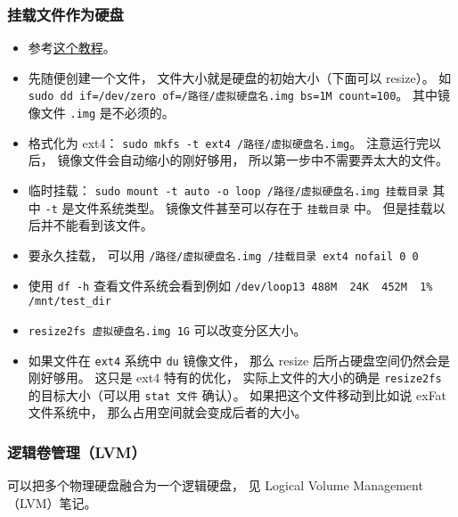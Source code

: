 \subsubsection{挂载文件作为硬盘}
\begin{itemize}
\item 参考\href{https://www.tecmint.com/create-virtual-harddisk-volume-in-linux/}{这个教程}。
\item 先随便创建一个文件， 文件大小就是硬盘的初始大小（下面可以 resize）。 如 \verb|sudo dd if=/dev/zero of=/路径/虚拟硬盘名.img bs=1M count=100|。 其中镜像文件 \verb|.img| 是不必须的。
\item 格式化为 ext4： \verb|sudo mkfs -t ext4 /路径/虚拟硬盘名.img|。 注意运行完以后， 镜像文件会自动缩小的刚好够用， 所以第一步中不需要弄太大的文件。
\item 临时挂载： \verb|sudo mount -t auto -o loop /路径/虚拟硬盘名.img 挂载目录| 其中 \verb|-t| 是文件系统类型。 镜像文件甚至可以存在于 \verb|挂载目录| 中。 但是挂载以后并不能看到该文件。
\item 要永久挂载， 可以用 \verb|/路径/虚拟硬盘名.img /挂载目录 ext4 nofail 0 0|
\item 使用 \verb|df -h| 查看文件系统会看到例如 \verb|/dev/loop13 488M  24K  452M  1% /mnt/test_dir|
\item \verb|resize2fs 虚拟硬盘名.img 1G| 可以改变分区大小。
\item 如果文件在 \verb|ext4| 系统中 \verb|du| 镜像文件， 那么 resize 后所占硬盘空间仍然会是刚好够用。 这只是 ext4 特有的优化， 实际上文件的大小的确是 \verb|resize2fs| 的目标大小（可以用 \verb|stat 文件| 确认）。 如果把这个文件移动到比如说 exFat 文件系统中， 那么占用空间就会变成后者的大小。
\end{itemize}

\subsubsection{逻辑卷管理（LVM）}
可以把多个物理硬盘融合为一个逻辑硬盘， 见 Logical Volume Management（LVM）笔记。

